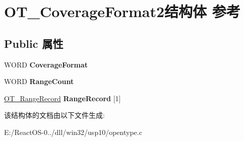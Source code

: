 \hypertarget{struct_o_t___coverage_format2}{}\section{O\+T\+\_\+\+Coverage\+Format2结构体 参考}
\label{struct_o_t___coverage_format2}
\subsection*{Public 属性}
\begin{DoxyCompactItemize}
\item 
\mbox{\label{struct_o_t___coverage_format2_a9c74022ed2683f0e20392f9fbfc32b02}} 
W\+O\+RD {\bfseries Coverage\+Format}
\item 
\mbox{\label{struct_o_t___coverage_format2_ac19348f43c9b258e5aacd37ee412645b}} 
W\+O\+RD {\bfseries Range\+Count}
\item 
\mbox{\label{struct_o_t___coverage_format2_ae84bc0bd6ece577ef301537a0909853a}} 
\hyperlink{struct_o_t___range_record}{O\+T\+\_\+\+Range\+Record} {\bfseries Range\+Record} \mbox{[}1\mbox{]}
\end{DoxyCompactItemize}


该结构体的文档由以下文件生成\+:\begin{DoxyCompactItemize}
\item 
E\+:/\+React\+O\+S-\/0../dll/win32/usp10/opentype.\+c\end{DoxyCompactItemize}
